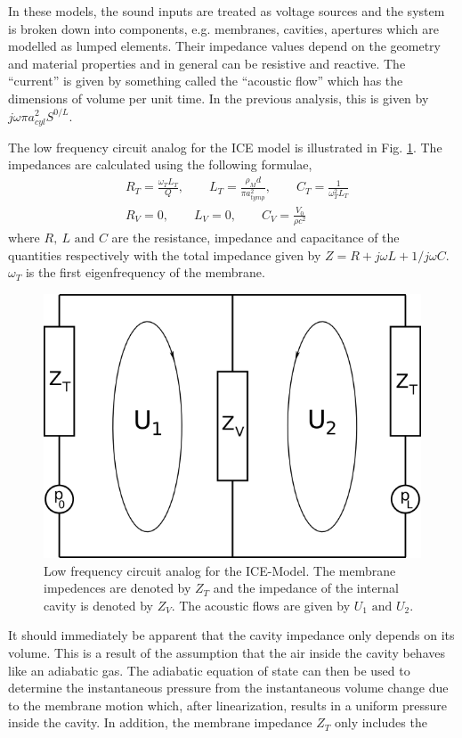 In these models, the sound inputs are treated as voltage sources and the system is broken down into components, e.g.	 membranes,
cavities, apertures which are modelled as lumped elements. Their impedance values depend on the geometry and material properties and in general
 can be resistive and reactive. The ``current'' is given by something called the ``acoustic flow'' which has the dimensions of
volume per unit time. In the previous analysis, this is given by $j\omega\pi a^2_{cyl}S^{0/L}$. 

The low frequency circuit analog for the ICE model is illustrated in Fig. \ref{lowfreqcircuit}. The impedances are calculated
using the following formulae,
\begin{align}
 &R_T=\frac{\omega_TL_T}{Q},\qquad L_T=\frac{\rho_Md}{\pi a_{tymp}^2},\qquad C_T=\frac{1}{\omega^2_TL_T}\\
 &R_V=0,\qquad L_V=0,\qquad C_V=\frac{V_0}{\rho c^2}
\end{align}
where $R,\ L\mbox{ and }C$ are the resistance, impedance and capacitance of the quantities respectively with the total impedance
given by $Z=R+j\omega L+1/j\omega C$. $\omega_T$ is the first eigenfrequency of the membrane.
\begin{figure}[ht!]
 \centering
 \includegraphics[width=.5\linewidth]{Diagrams/lowfreqcircuit.png}
 \caption[Low frequency circuit analog]{Low frequency circuit analog for the ICE-Model. The membrane impedences are denoted by $Z_T$ and the impedance of 
 the internal cavity is denoted by $Z_V$. The acoustic flows are given by $U_1\mbox{ and }U_2$.}
  \label{lowfreqcircuit}
\end{figure}
It should immediately be apparent that the cavity impedance only depends on its volume. This is a result of the assumption 
that the air inside the cavity behaves like an adiabatic gas. The adiabatic equation of state can then be used
to determine the instantaneous pressure from the instantaneous volume change due to the membrane
motion which, after linearization, results in a uniform pressure inside the cavity. In addition, the membrane impedance $Z_T$ only includes the
